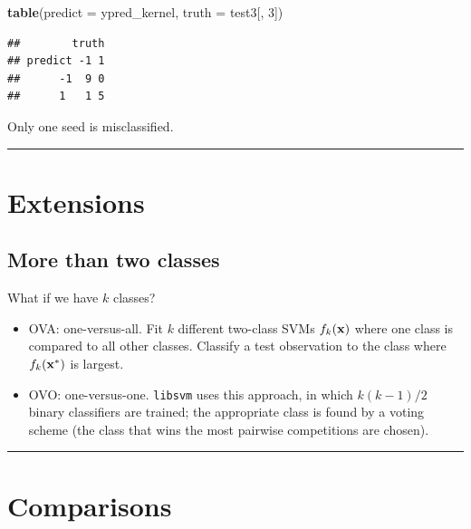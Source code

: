 \documentclass[]{article}
\newenvironment{Shaded}{\begin{snugshade}}{\end{snugshade}}
\newcommand{\DataTypeTok}[1]{\textcolor[rgb]{0.13,0.29,0.53}{#1}}
\newcommand{\DecValTok}[1]{\textcolor[rgb]{0.00,0.00,0.81}{#1}}
\newcommand{\KeywordTok}[1]{\textcolor[rgb]{0.13,0.29,0.53}{\textbf{#1}}}
\newcommand{\NormalTok}[1]{#1}
\providecommand{\tightlist}{%
  \setlength{\itemsep}{0pt}\setlength{\parskip}{0pt}}
\begin{document}
\begin{Shaded}
\begin{Highlighting}[]
\KeywordTok{table}\NormalTok{(}\DataTypeTok{predict =}\NormalTok{ ypred_kernel, }\DataTypeTok{truth =}\NormalTok{ test3[, }\DecValTok{3}\NormalTok{])}
\end{Highlighting}
\end{Shaded}

\begin{verbatim}
##        truth
## predict -1 1
##      -1  9 0
##      1   1 5
\end{verbatim}

Only one seed is misclassified.

\begin{center}\rule{0.5\linewidth}{\linethickness}\end{center}

\hypertarget{extensions}{%
\section{Extensions}\label{extensions}}

\hypertarget{more-than-two-classes}{%
\subsection{More than two classes}\label{more-than-two-classes}}

What if we have \(k\) classes?

\begin{itemize}
\tightlist
\item
  OVA: one-versus-all. Fit \(k\) different two-class SVMs
  \(f_k({\bf x})\) where one class is compared to all other classes.
  Classify a test observation to the class where \(f_k({\bf x}^*)\) is
  largest.
\item
  OVO: one-versus-one. \texttt{libsvm} uses this approach, in which
  \(k(k-1)/2\) binary classifiers are trained; the appropriate class is
  found by a voting scheme (the class that wins the most pairwise
  competitions are chosen).
\end{itemize}

\begin{center}\rule{0.5\linewidth}{\linethickness}\end{center}

\hypertarget{comparisons}{%
\section{ Comparisons}\label{comparisons}}
\end{document}
